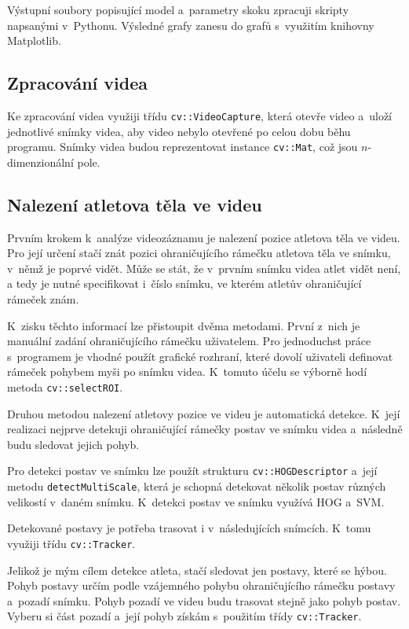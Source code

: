 Výstupní soubory popisující model a~parametry skoku zpracuji skripty napsanými v~Pythonu. Výsledné grafy zanesu do grafů s~využitím knihovny Matplotlib.

\subsection{Zpracování videa}

Ke zpracování videa využiji třídu \texttt{cv::VideoCapture}, která otevře video a~uloží jednotlivé snímky videa, aby video nebylo otevřené po celou dobu běhu programu. Snímky videa budou reprezentovat instance \texttt{cv::Mat}, což jsou $n$-dimenzionální pole.

\subsection{Nalezení atletova těla ve videu}

Prvním krokem k~analýze videozáznamu je nalezení pozice atletova těla ve videu. Pro její určení stačí znát pozici ohraničujícího rámečku atletova těla ve snímku, v~němž je poprvé vidět. Může se stát, že v~prvním snímku videa atlet vidět není, a tedy je nutné specifikovat i~číslo snímku, ve kterém atletův ohraničující rámeček znám.

K~zisku těchto informací lze přistoupit dvěma metodami. První z~nich je manuální zadání ohraničujícího rámečku uživatelem. Pro jednoduchst práce s~programem je vhodné použít grafické rozhraní, které dovolí uživateli definovat rámeček pohybem myši po snímku videa. K~tomuto účelu se výborně hodí metoda \texttt{cv::selectROI}.

Druhou metodou nalezení atletovy pozice ve videu je automatická detekce. K~její realizaci nejprve detekuji ohraničující rámečky postav ve snímku videa a~následně budu sledovat jejich pohyb.

Pro detekci postav ve snímku lze použít strukturu \texttt{cv::HOGDescriptor} a~její metodu \texttt{detectMultiScale}, která je schopná detekovat několik postav různých velikostí v~daném snímku. K~detekci postav ve snímku využívá HOG a~SVM.

Detekované postavy je potřeba trasovat i v~následujících snímcích. K~tomu využiji třídu \texttt{cv::Tracker}.

Jelikož je mým cílem detekce atleta, stačí sledovat jen postavy, které se hýbou. Pohyb postavy určím podle vzájemného pohybu ohraničujícího rámečku postavy a~pozadí snímku. Pohyb pozadí ve videu budu trasovat stejně jako pohyb postav. Vyberu si část pozadí a~její pohyb získám s~použitím třídy \texttt{cv::Tracker}.

